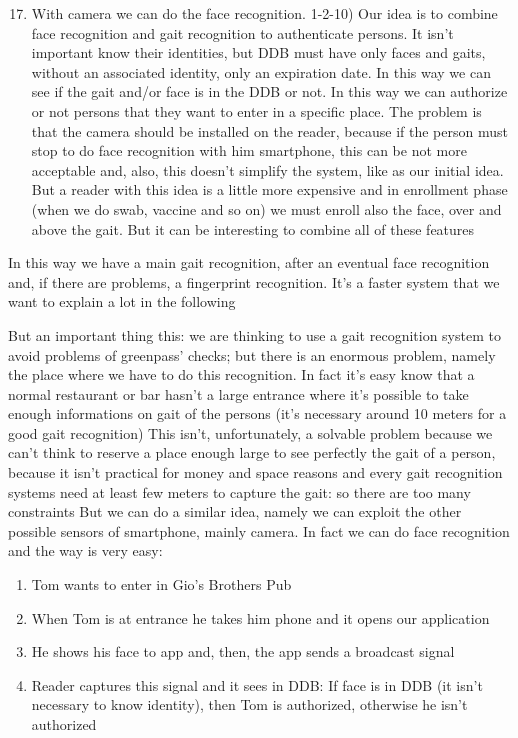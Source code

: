 \documentclass[12pt]{article}
\begin{document}
\begin{enumerate}
  \setcounter{enumi}{16}
  \item With camera we can do the face recognition. 1-2-10) Our idea is to combine face recognition and gait recognition to authenticate persons. It isn't important know their identities, but DDB must have only faces and gaits, without an associated identity, only an expiration date. In this way we can see if the gait and/or face is in the DDB or not. In this way we can authorize or not persons that they want to enter in a specific place. The problem is that the camera should be installed on the reader, because if the person must stop to do face recognition with him smartphone, this can be not more acceptable and, also, this doesn't simplify the system, like as our initial idea. But a reader with this idea is a little more expensive and in enrollment phase (when we do swab, vaccine and so on) we must enroll also the face, over and above the gait. But it can be interesting to combine all of these features

\end{enumerate}

In this way we have a main gait recognition, after an eventual face recognition and, if there are problems, a fingerprint recognition. It's a faster system that we want to explain a lot in the following

But an important thing this: we are thinking to use a gait recognition system to avoid problems of greenpass' checks; but there is an enormous problem, namely the place where we have to do this recognition. In fact it's easy know that a normal restaurant or bar hasn't a large entrance where it's possible to take enough informations on gait of the persons (it's necessary around 10 meters for a good gait recognition)
This isn't, unfortunately, a solvable problem because we can't think to reserve a place enough large to see perfectly the gait of a person, because it isn't practical for money and space reasons and every gait recognition systems need at least few meters to capture the gait: so there are too many constraints
But we can do a similar idea, namely we can exploit the other possible sensors of smartphone, mainly camera. In fact we can do face recognition and the way is very easy:

\begin{enumerate}

\item Tom wants to enter in Gio's Brothers Pub

\item When Tom is at entrance he takes him phone and it opens our application

\item He shows his face to app and, then, the app sends a broadcast signal
\item Reader captures this signal and it sees in DDB: If face is in DDB (it isn't necessary to know identity), then Tom is authorized, otherwise he isn't authorized

\end{enumerate}
\end{document}
